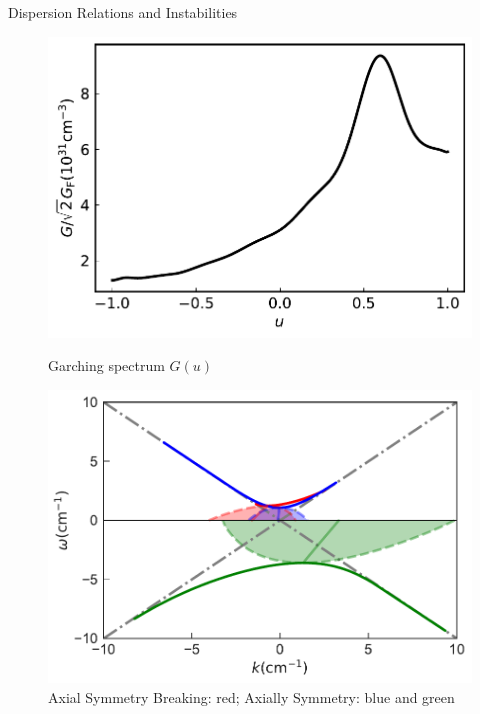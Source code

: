 \begin{frame}{Dispersion Relations and Instabilities}
   \begin{figure}
        \includegraphics[width=\linewidth]{assets/dr/spectGarchingPlt.pdf}
        \caption*{Garching spectrum $G(u)$}
      \endminipage\hfill
      \includegraphics[width=\linewidth]{assets/dr/spectGarchingDRLSAPltBlob.pdf}
      \caption*{ Axial Symmetry Breaking: red; Axially Symmetry: blue and green }
      \endminipage\hfill
   \end{figure}


\end{frame}
